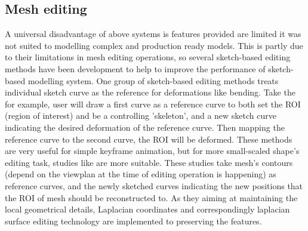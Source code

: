 \documentclass[10pt,twocolumn,letterpaper]{article}
\begin{document}
\subsection{Mesh editing}
A universal disadvantage of above systems is features provided are limited it was not suited to modelling complex and production ready models. This is partly due to their limitations in mesh editing operations, so several sketch-based editing methods have been development to help to improve the performance of sketch-based modelling system. One group of sketch-based editing methods \cite{draper2003gestural, kho2005sketching} treats individual sketch curve as the reference for deformations like bending. Take the \cite{kho2005sketching} for example, user will draw a first curve as a reference curve to both set the ROI (region of interest) and be a controlling 'skeleton', and a new sketch curve indicating the desired deformation of the reference curve. Then mapping the reference curve to the second curve, the ROI will be deformed. These methods are very useful for simple keyframe animation, but for more small-scaled shape's editing task, studies like \cite{lipman2004differential,nealen2007sketch,SBM:SBM07:023-030} are more suitable. These studies take mesh's contours (depend on the viewplan at the time of editing operation is happening) as reference curves, and the newly sketched curves indicating the new positions that the ROI of mesh should be reconstructed to. As they aiming at maintaining the local geometrical details, Laplacian coordinates and correspondingly laplacian surface editing technology are implemented to preserving the features. 
\end{document}
